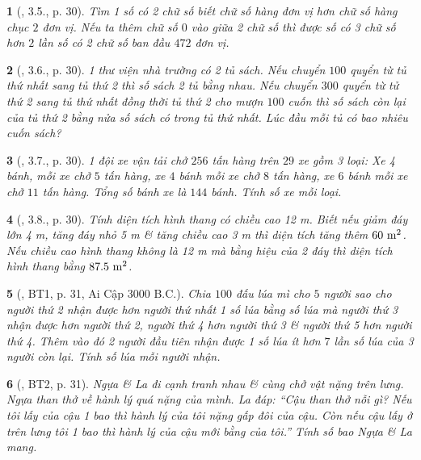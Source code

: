 \documentclass{article}
\newtheorem{baitoan}{}
\begin{document}
\begin{baitoan}[\cite{Binh_boi_duong_Toan_9_tap_2}, 3.5., p. 30]
	Tìm 1 số có 2 chữ số biết chữ số hàng đơn vị hơn chữ số hàng chục $2$ đơn vị. Nếu ta thêm chữ số $0$ vào giữa 2 chữ số thì được số có 3 chữ số hơn $2$ lần số có 2 chữ số ban đầu $472$ đơn vị.
\end{baitoan}

\begin{baitoan}[\cite{Binh_boi_duong_Toan_9_tap_2}, 3.6., p. 30]
	1 thư viện nhà trường có 2 tủ sách. Nếu chuyển $100$ quyển từ tủ thứ nhất sang tủ thứ 2 thì số sách 2 tủ bằng nhau. Nếu chuyển $300$ quyển từ tử thứ 2 sang tủ thứ nhất đồng thời tủ thứ 2 cho mượn $100$ cuốn thì số sách còn lại của tủ thứ 2 bằng nửa số sách có trong tủ thứ nhất. Lúc đầu mỗi tủ có bao nhiêu cuốn sách?
\end{baitoan}

\begin{baitoan}[\cite{Binh_boi_duong_Toan_9_tap_2}, 3.7., p. 30]
	1 đội xe vận tải chở $256$ tấn hàng trên $29$ xe gồm 3 loại: Xe 4 bánh, mỗi xe chở $5$ tấn hàng, xe $4$ bánh mỗi xe chở $8$ tấn hàng, xe $6$ bánh mỗi xe chở $11$ tấn hàng. Tổng số bánh xe là $144$ bánh. Tính số xe mỗi loại.
\end{baitoan}

\begin{baitoan}[\cite{Binh_boi_duong_Toan_9_tap_2}, 3.8., p. 30]
	Tính diện tích hình thang có chiều cao {\rm12 m}. Biết nếu giảm đáy lớn {\rm4 m}, tăng đáy nhỏ {\rm5 m} \& tăng chiều cao {\rm3 m} thì diện tích tăng thêm $\rm60\ m^2$. Nếu chiều cao hình thang không là {\rm12 m} mà bằng hiệu của 2 đáy thì diện tích hình thang bằng $\rm87.5\ m^2$.
\end{baitoan}

\begin{baitoan}[\cite{Binh_boi_duong_Toan_9_tap_2}, BT1, p. 31, Ai Cập 3000 B.C.]
	Chia $100$ đấu lúa mì cho $5$ người sao cho người thứ 2 nhận được hơn người thứ nhất 1 số lúa bằng số lúa mà người thứ 3 nhận được hơn người thứ 2, người thứ 4 hơn người thứ 3 \& người thứ 5 hơn người thứ 4. Thêm vào đó 2 người đầu tiên nhận được 1 số lúa ít hơn $7$ lần số lúa của 3 người còn lại. Tính số lúa mỗi người nhận.
\end{baitoan}

\begin{baitoan}[\cite{Binh_boi_duong_Toan_9_tap_2}, BT2, p. 31]
	Ngựa \& La đi cạnh tranh nhau \& cùng chở vật nặng trên lưng. Ngựa than thở về hành lý quá nặng của mình. La đáp: ``Cậu than thở nỗi gì? Nếu tôi lấy của cậu 1 bao thì hành lý của tôi nặng gấp đôi của cậu. Còn nếu cậu lấy ở trên lưng tôi 1 bao thì hành lý của cậu mới bằng của tôi.'' Tính số bao Ngựa \& La mang.
\end{baitoan}
\end{document}

